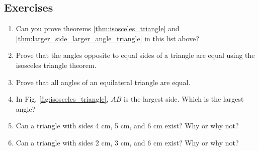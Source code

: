 \documentclass[11pt]{article}
\begin{document}
\subsection{Exercises}
\begin{framed}
    \begin{enumerate}
        \item Can you prove theorems \ref{thm:isosceles_triangle} and \ref{thm:larger_side_larger_angle_triangle} in this list above?
        \item Prove that the angles opposite to equal sides of a triangle are equal using the isosceles triangle theorem.
        \item Prove that all angles of an equilateral triangle are equal.
        \item In Fig. \ref{fig:isosceles_triangle}, $AB$ is the largest side. Which is the largest angle?
        \item Can a triangle with sides 4 cm, 5 cm, and 6 cm exist? Why or why not?
        \item Can a triangle with sides 2 cm, 3 cm, and 6 cm exist? Why or why not?
    \end{enumerate}
\end{framed}
\end{document}
